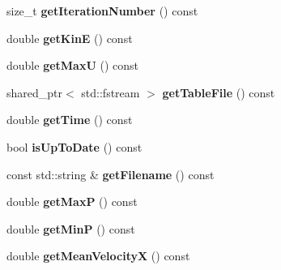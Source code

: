 \begin{DoxyCompactItemize}
\item 
\hypertarget{classnatrium_1_1SolverStats_acf824edde9e155f0c19c591179fed5eb}{
size\_\-t {\bfseries getIterationNumber} () const }
\label{classnatrium_1_1SolverStats_acf824edde9e155f0c19c591179fed5eb}

\item 
\hypertarget{classnatrium_1_1SolverStats_a24d2637fa64a779c0f01820ae7e0dfa6}{
double {\bfseries getKinE} () const }
\label{classnatrium_1_1SolverStats_a24d2637fa64a779c0f01820ae7e0dfa6}

\item 
\hypertarget{classnatrium_1_1SolverStats_ac880e86e2e93cafad88fa447ebb641b5}{
double {\bfseries getMaxU} () const }
\label{classnatrium_1_1SolverStats_ac880e86e2e93cafad88fa447ebb641b5}

\item 
\hypertarget{classnatrium_1_1SolverStats_ae4ab93dfcac8500e41afe4d14b485a3a}{
shared\_\-ptr$<$ std::fstream $>$ {\bfseries getTableFile} () const }
\label{classnatrium_1_1SolverStats_ae4ab93dfcac8500e41afe4d14b485a3a}

\item 
\hypertarget{classnatrium_1_1SolverStats_a7eb7473ffe34d624bb8c09666021a6e8}{
double {\bfseries getTime} () const }
\label{classnatrium_1_1SolverStats_a7eb7473ffe34d624bb8c09666021a6e8}

\item 
\hypertarget{classnatrium_1_1SolverStats_ade0d711e048a834547ad32643bc2b529}{
bool {\bfseries isUpToDate} () const }
\label{classnatrium_1_1SolverStats_ade0d711e048a834547ad32643bc2b529}

\item 
\hypertarget{classnatrium_1_1SolverStats_aedf3ce8027cba3da15c8b28241234c94}{
const std::string \& {\bfseries getFilename} () const }
\label{classnatrium_1_1SolverStats_aedf3ce8027cba3da15c8b28241234c94}

\item 
\hypertarget{classnatrium_1_1SolverStats_a101f0b150f9bf2bf48ae6c4031f4c270}{
double {\bfseries getMaxP} () const }
\label{classnatrium_1_1SolverStats_a101f0b150f9bf2bf48ae6c4031f4c270}

\item 
\hypertarget{classnatrium_1_1SolverStats_a582de4d3fd470f78c03cada1c8ebf959}{
double {\bfseries getMinP} () const }
\label{classnatrium_1_1SolverStats_a582de4d3fd470f78c03cada1c8ebf959}

\item 
\hypertarget{classnatrium_1_1SolverStats_a331dab963d64362612b3378fc9588894}{
double {\bfseries getMeanVelocityX} () const }
\label{classnatrium_1_1SolverStats_a331dab963d64362612b3378fc9588894}

\end{DoxyCompactItemize}


